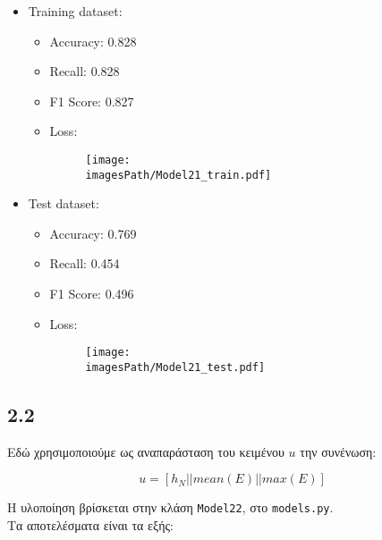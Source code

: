 \documentclass[a4paper, 12pt]{article}
\newcommand{\imagesPath}{results}
\newcommand{\myWidth}{0.8\linewidth}
\begin{document}
        \begin{itemize}
            \item Training dataset:
                \begin{itemize}
                    \item Accuracy: 0.828
                    \item Recall: 0.828
                    \item F1 Score: 0.827
                    \item Loss:
                        \begin{figure}[H]
                            \centering
                            \texttt{[image: \\imagesPath/Model21\_train.pdf]}
                        \end{figure}
                \end{itemize}
                
            \item Test dataset:
                \begin{itemize}
                    \item Accuracy: 0.769
                    \item Recall: 0.454
                    \item F1 Score: 0.496
                    \item Loss:
                        \begin{figure}[H]
                            \centering
                            \texttt{[image: \\imagesPath/Model21\_test.pdf]}
                        \end{figure}
                \end{itemize}
        \end{itemize}

    \subsection*{2.2} 
        
        Εδώ χρησιμοποιούμε ως αναπαράσταση του κειμένου $u$ την συνένωση:
        
        \[
            u = \left[ h_N || mean(E) || max(E) \right]
        \]
        
        Η υλοποίηση βρίσκεται στην κλάση \verb|Model22|, στο \verb|models.py|. \\
        
        Τα αποτελέσματα είναι τα εξής:
        
\end{document}
